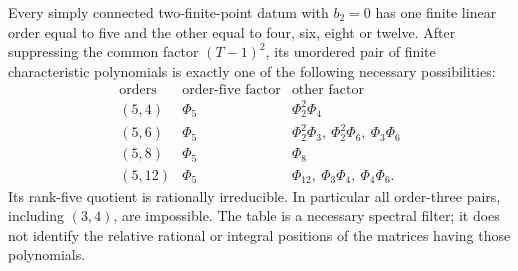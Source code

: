\begin{theorem}\label{maps:src:F.2.14}


Every simply connected two-finite-point datum with $b_2=0$ has
one finite linear order equal to five and the other equal
to four, six, eight or twelve.
After suppressing the common factor $(T-1)^2$, its unordered
pair of finite characteristic polynomials is exactly one
of the following necessary possibilities:
\[
\begin{array}{c|c|l}
 \text{orders}&\text{order-five factor}&\text{other factor}\\\hline
 (5,4)&\Phi_5&\Phi_2^2\Phi_4\\
 (5,6)&\Phi_5&\Phi_2^2\Phi_3,\ \Phi_2^2\Phi_6,\ \Phi_3\Phi_6\\
 (5,8)&\Phi_5&\Phi_8\\
 (5,12)&\Phi_5&\Phi_{12},\ \Phi_3\Phi_4,\ \Phi_4\Phi_6.
\end{array}
 \tag{F.39}\label{maps:eq:F.39}
\]
Its rank-five quotient is rationally irreducible.
In particular all order-three pairs, including $(3,4)$,
are impossible.  The table is a necessary spectral filter;
it does not identify the relative rational or integral
positions of the matrices having those polynomials.

\end{theorem}


